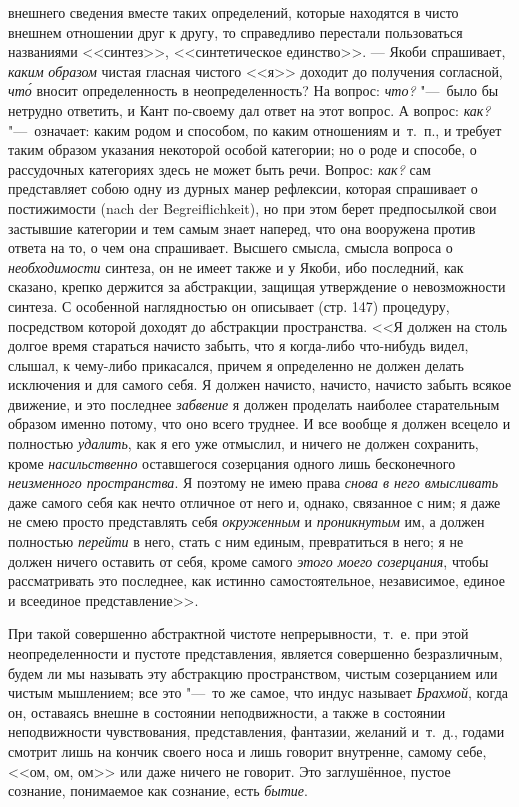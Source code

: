 внешнего сведения вместе таких определений, которые находятся в чисто
внешнем отношении друг к другу, то справедливо перестали пользоваться
названиями <<синтез>>, <<синтетическое единство>>. --- Якоби спрашивает,
{\em каким} {\em образом} чистая
гласная чистого <<я>> доходит до получения согласной,
{\em чт\'{о}} вносит определенность в неопределенность? На
вопрос: {\em что?} "---~было бы нетрудно ответить, и Кант
по-своему дал ответ на этот вопрос. А вопрос:
{\em как?} "---~означает: каким родом и способом, по каким
отношениям и~т.~п., и требует таким образом указания некоторой особой
категории; но о роде и способе, о рассудочных категориях здесь не может
быть речи. Вопрос: {\em как?} сам представляет собою
одну из дурных манер рефлексии, которая спрашивает о постижимости (nach der
Begreiflichkeit), но при этом берет предпосылкой свои застывшие категории и
тем самым знает наперед, что она вооружена против ответа на то, о чем она
спрашивает. Высшего смысла, смысла вопроса о
{\em необходимости} синтеза, он не имеет также и у
Якоби, ибо последний, как сказано, крепко держится за абстракции, защищая
утверждение о невозможности синтеза. С особенной наглядностью он описывает
(стр. 147) процедуру, посредством которой доходят до абстракции
пространства. <<Я должен на столь долгое время стараться начисто забыть, что
я когда-либо что-нибудь видел, слышал, к чему-либо прикасался, причем я
определенно не должен делать исключения и для самого себя. Я должен
начисто, начисто, начисто забыть всякое движение, и это последнее
{\em забвение} я должен проделать наиболее старательным
образом именно потому, что оно всего труднее. И все вообще я должен всецело
и полностью {\em удалить}, как я его уже отмыслил, и
ничего не должен сохранить, кроме {\em насильственно}
оставшегося созерцания одного лишь бесконечного
{\em неизменного пространства}. Я поэтому не имею права
{\em снова в него вмысливать} даже самого себя как
нечто отличное от него и, однако, связанное с ним; я даже не смею просто
представлять себя {\em окруженным} и
{\em проникнутым} им, а должен полностью
{\em перейти} в него, стать с ним единым, превратиться
в него; я не должен ничего оставить от себя, кроме самого
{\em этого моего созерцания}, чтобы рассматривать это
последнее, как истинно самостоятельное, независимое, единое и всеединое
представление>>.

При такой совершенно абстрактной чистоте непрерывности,~т.~е. при этой
неопределенности и пустоте представления, является совершенно безразличным,
будем ли мы называть эту абстракцию пространством, чистым созерцанием или
чистым мышлением; все это "---~то же самое, что индус называет
{\em Брахмой}, когда он, оставаясь внешне в состоянии
неподвижности, а также в состоянии неподвижности чувствования,
представления, фантазии, желаний и~т.~д., годами смотрит лишь на кончик
своего носа и лишь говорит внутренне, самому себе, <<ом, ом, ом>> или даже
ничего не говорит. Это заглушённое, пустое сознание, понимаемое как
сознание, есть {\em бытие}.


